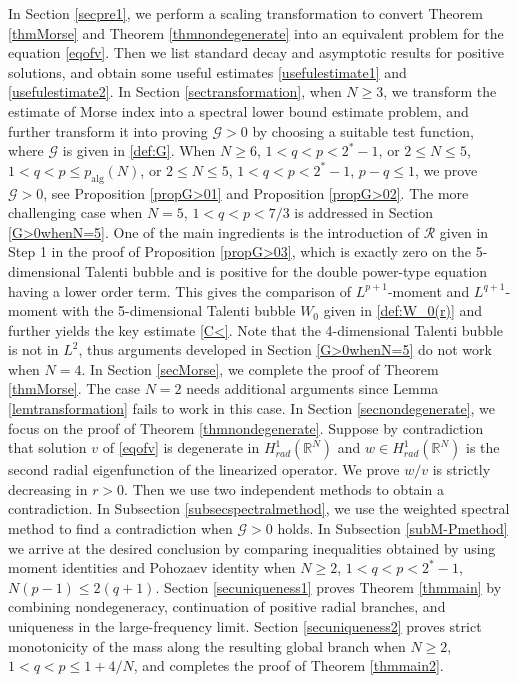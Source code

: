 \documentclass{article}
\theoremstyle{definition} \theoremstyle{remark}
\numberwithin{equation}{section}
\newcommand{\R}{\mathbb{R}}
\newcommand{\G}{\mathcal{G}}
\newcommand{\cR}{\mathcal{R}}
\begin{document}
	In Section \ref{secpre1}, we perform a scaling transformation to convert Theorem \ref{thmMorse} and Theorem \ref{thmnondegenerate} into an equivalent problem for the equation \eqref{eqofv}. Then we list standard decay and asymptotic results for positive solutions, and obtain some useful estimates \eqref{usefulestimate1} and \eqref{usefulestimate2}. In Section \ref{sectransformation}, when $N \ge 3$, we transform the estimate of Morse index into a spectral lower bound estimate problem, and further transform it into proving $\G > 0$ by choosing a suitable test function, where $\G$ is given in \eqref{def:G}. When $N \ge 6$, $1 < q < p < 2^*-1$, or $2 \le N \le 5$, $1 < q < p \le p_{\text{alg}}(N)$, or $2 \le N \le 5$, $1 < q < p < 2^*-1$, $p - q \le 1$, we prove $\G > 0$, see Proposition \ref{propG>01} and Proposition \ref{propG>02}. The more challenging case when $N = 5$, $1 < q < p < 7/3$ is addressed in Section \ref{G>0whenN=5}. One of the main ingredients is the introduction of $\cR$ given in Step 1 in the proof of Proposition \ref{propG>03}, which is exactly zero on the 5-dimensional Talenti bubble and is positive for the double power-type  equation having a lower order term. This gives the comparison of $L^{p+1}$-moment and $L^{q+1}$-moment with the 5-dimensional Talenti bubble $W_0$ given in \eqref{def:W_0(r)} and further yields the key estimate \eqref{C<}. Note that the 4-dimensional Talenti bubble is not in $L^2$, thus arguments developed in Section \ref{G>0whenN=5} do not work when $N = 4$. In Section \ref{secMorse}, we complete the proof of Theorem \ref{thmMorse}. The case $N = 2$ needs additional arguments since Lemma \ref{lemtransformation} fails to work in this case. In Section \ref{secnondegenerate}, we focus on the proof of Theorem \ref{thmnondegenerate}. Suppose by contradiction that solution $v$ of \eqref{eqofv} is degenerate in $H_{rad}^1(\R^N)$ and $w \in H_{rad}^1(\R^N)$ is the second radial eigenfunction of the linearized operator. We prove $w/v$ is strictly decreasing in $r > 0$. Then we use two independent methods to obtain a contradiction. In Subsection \ref{subsecspectralmethod}, we use the weighted spectral method to find a contradiction when $\G > 0$ holds. In Subsection \ref{subM-Pmethod} we arrive at the desired conclusion by comparing inequalities obtained by using moment identities and Pohozaev identity when $N \ge 2$, $1 < q < p < 2^* - 1$, $N(p-1) \le 2(q+1)$. Section \ref{secuniqueness1} proves Theorem \ref{thmmain} by combining nondegeneracy, continuation of positive radial branches, and uniqueness in the large-frequency limit. Section \ref{secuniqueness2} proves strict monotonicity of the mass along the resulting global branch when $N\ge 2$, $1 < q < p \le 1 + 4/N$, and completes the proof of Theorem \ref{thmmain2}.
\end{document}
